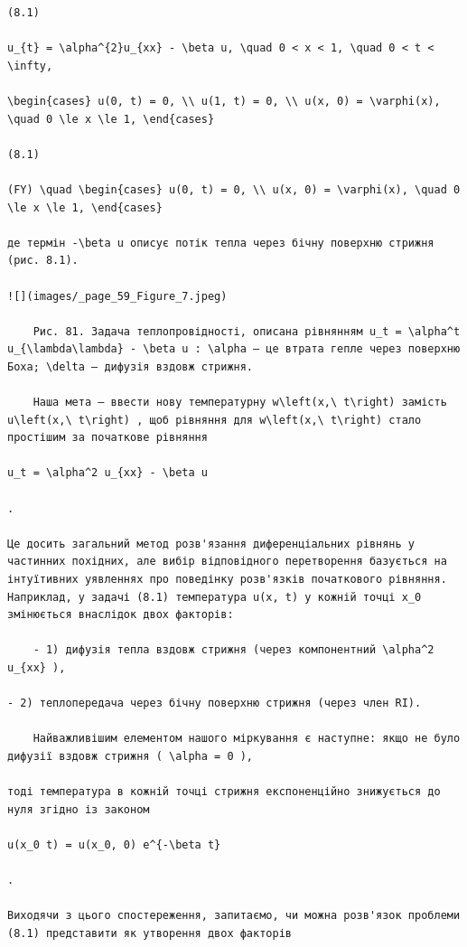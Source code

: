 \documentclass[
  ukrainian,
]{article}
\begin{document}
\begin{verbatim}
(8.1)

u_{t} = \alpha^{2}u_{xx} - \beta u, \quad 0 < x < 1, \quad 0 < t < \infty,

\begin{cases} u(0, t) = 0, \\ u(1, t) = 0, \\ u(x, 0) = \varphi(x), \quad 0 \le x \le 1, \end{cases}

(8.1)

(FY) \quad \begin{cases} u(0, t) = 0, \\ u(x, 0) = \varphi(x), \quad 0 \le x \le 1, \end{cases}

де термін -\beta u описує потік тепла через бічну поверхню стрижня (рис. 8.1).

![](images/_page_59_Figure_7.jpeg)

    Рис. 81. Задача теплопровідності, описана рівнянням u_t = \alpha^t u_{\lambda\lambda} - \beta u : \alpha — це втрата гепле через поверхню Боха; \delta – дифузія вздовж стрижня.

    Наша мета — ввести нову температурну w\left(x,\ t\right) замість u\left(x,\ t\right) , щоб рівняння для w\left(x,\ t\right) стало простішим за початкове рівняння

u_t = \alpha^2 u_{xx} - \beta u

.

Це досить загальний метод розв'язання диференціальних рівнянь у частинних похідних, але вибір відповідного перетворення базується на інтуїтивних уявленнях про поведінку розв'язків початкового рівняння. Наприклад, у задачі (8.1) температура u(x, t) у кожній точці x_0 змінюється внаслідок двох факторів:

    - 1) дифузія тепла вздовж стрижня (через компонентний \alpha^2 u_{xx} ),

- 2) теплопередача через бічну поверхню стрижня (через член RI).

    Найважливішим елементом нашого міркування є наступне: якщо не було дифузії вздовж стрижня ( \alpha = 0 ),

тоді температура в кожній точці стрижня експоненційно знижується до нуля згідно із законом

u(x_0 t) = u(x_0, 0) e^{-\beta t}

.

Виходячи з цього спостереження, запитаємо, чи можна розв'язок проблеми (8.1) представити як утворення двох факторів


\end{verbatim}
\end{document}
